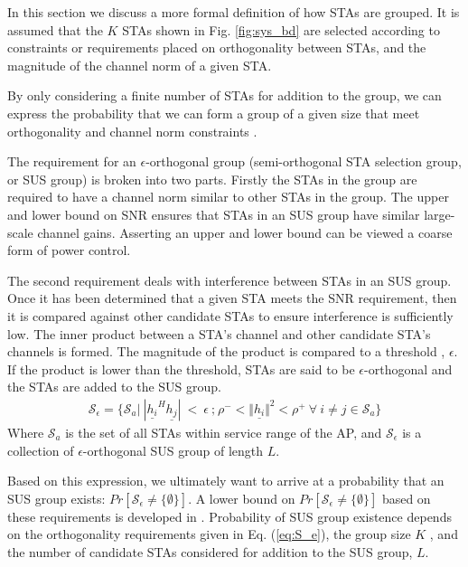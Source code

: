 In this section we discuss a more formal definition of how STAs are grouped. It is assumed that the $K$ STAs shown in Fig. \ref{fig:sys_bd} are selected according to constraints or requirements placed on orthogonality between STAs, and the magnitude of the channel norm of a given STA. 

By only considering a finite number of STAs for addition to the group, we can express the probability that we can form a group of a given size that meet orthogonality and channel norm constraints \cite{Swannack2005}. 

The requirement for an $\epsilon$-orthogonal group (semi-orthogonal STA selection group, or SUS group) is broken into two parts. Firstly the STAs in the group are required to have a channel norm similar to other STAs in the group. The upper and lower bound on SNR ensures that STAs in an SUS group have similar large-scale channel gains. Asserting an upper and lower bound can be viewed a coarse form of power control. 

The second requirement deals with interference between STAs in an SUS group. Once it has been determined that a given STA meets the SNR requirement, then it is compared against other candidate STAs to ensure interference is sufficiently low. The inner product between a STA's channel and other candidate STA's channels is formed. The magnitude of the product is compared to a threshold , $\epsilon$. If the product is lower than the threshold, STAs are said to be $\epsilon$-orthogonal and the STAs are added to the SUS group.
 \begin{equation}\label{eq:S_e}
    \begin{aligned}
        \mathcal{S}_\epsilon = \lbrace \mathcal{S}_a \big|\ | \underline{h_i}^H\underline{h_j} |\ <\ \epsilon \ \text{;} \ \rho^-<\Vert \underline{h_i} \Vert^2 < \rho^+\ \forall \ i \neq j \in \mathcal{S}_a \rbrace
    \end{aligned}
\end{equation}
Where $\mathcal{S}_a$ is the set of all STAs within service range of the AP, and $\mathcal{S}_\epsilon$ is a collection of $\epsilon$-orthogonal SUS group of length $L$.

Based on this expression, we ultimately want to arrive at a probability that an SUS group exists: $Pr[\mathcal{S}_\epsilon \neq \lbrace \emptyset \rbrace]$. A lower bound on $Pr[\mathcal{S}_\epsilon \neq \lbrace \emptyset \rbrace]$ based on these requirements is developed in \cite{Swannack2005}. Probability of SUS group existence depends on the orthogonality requirements given in Eq. (\ref{eq:S_e}), the group size $K$ , and the number of candidate STAs considered for addition to the SUS group, $L$. 

